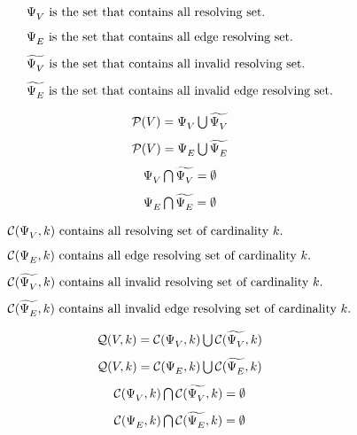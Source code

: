 \begin{definition}
	\[\begin{array}{l}
		\Psi^{}_{V} \text{ is the set that contains all resolving set.} \\ [8pt]
		\Psi^{}_{E} \text{ is the set that contains all edge resolving set.} \\ [8pt]
		\widetilde{\Psi^{}_{V}} \text{ is the set that contains all invalid resolving set.} \\ [8pt]
		\widetilde{\Psi^{}_{E}} \text{ is the set that contains all invalid edge resolving set.}
	\end{array}\]
\end{definition}

\begin{corollary}
	\[\begin{array}{c}
		\mathcal{P}(V) = \Psi^{}_{V} \bigcup \widetilde{\Psi^{}_{V}} \\ [8pt]
		\mathcal{P}(V) = \Psi^{}_{E} \bigcup \widetilde{\Psi^{}_{E}} \\ [8pt]
		\Psi^{}_{V} \bigcap \widetilde{\Psi^{}_{V}} = \emptyset \\ [8pt]
		\Psi^{}_{E} \bigcap \widetilde{\Psi^{}_{E}} = \emptyset
	\end{array}\]
\end{corollary}

\begin{lemma}
	\[\begin{array}{l}
		\mathcal{C}(\Psi^{}_{V},k) \text{ contains all resolving set of cardinality } k \text{.} \\ [8pt]
		\mathcal{C}(\Psi^{}_{E},k) \text{ contains all edge resolving set of cardinality } k \text{.} \\ [8pt]
		\mathcal{C}(\widetilde{\Psi^{}_{V}},k) \text{ contains all invalid resolving set of cardinality } k \text{.} \\ [8pt]
		\mathcal{C}(\widetilde{\Psi^{}_{E}},k) \text{ contains all invalid edge resolving set of cardinality } k \text{.}
	\end{array}\]
\end{lemma}

\begin{corollary}
	\[\begin{array}{c}
		\mathcal{Q}(V,k) = \mathcal{C}(\Psi^{}_{V},k) \bigcup \mathcal{C}(\widetilde{\Psi^{}_{V}},k) \\ [8pt]
		\mathcal{Q}(V,k) = \mathcal{C}(\Psi^{}_{E},k) \bigcup \mathcal{C}(\widetilde{\Psi^{}_{E}},k) \\ [8pt]
		\mathcal{C}(\Psi^{}_{V},k) \bigcap \mathcal{C}(\widetilde{\Psi^{}_{V}},k) = \emptyset \\ [8pt]
		\mathcal{C}(\Psi^{}_{E},k) \bigcap \mathcal{C}(\widetilde{\Psi^{}_{E}},k) = \emptyset
	\end{array}\]
\end{corollary}

